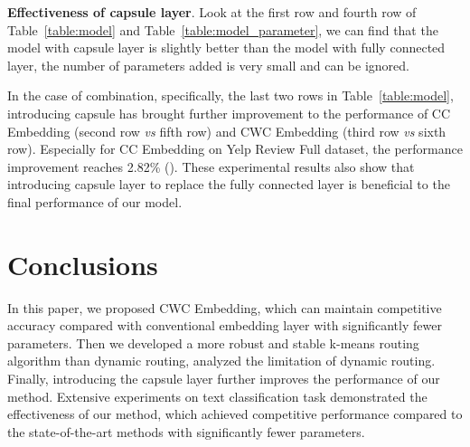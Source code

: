 \documentclass[times,twocolumn,final]{elsarticle}
\begin{document}
\noindent\textbf{Effectiveness of capsule layer}. Look at the first row and fourth row of Table~\ref{table:model} and Table~\ref{table:model_parameter}, we can find that the model with capsule layer is slightly better than the model with fully connected layer, the number of parameters added is very small and can be ignored.

In the case of combination, specifically, the last two rows in Table~\ref{table:model}, introducing capsule has brought further improvement to the performance of CC Embedding (second row \textit{vs} fifth row) and CWC Embedding (third row \textit{vs} sixth row). Especially for CC Embedding on Yelp Review Full dataset, the performance improvement reaches 2.82\% (). These experimental results also show that introducing capsule layer to replace the fully connected layer is beneficial to the final performance of our model.

\section{Conclusions}

In this paper, we proposed CWC Embedding, which can maintain competitive accuracy compared with conventional embedding layer with significantly fewer parameters. Then we developed a more robust and stable k-means routing algorithm than dynamic routing, analyzed the limitation of dynamic routing. Finally, introducing the capsule layer further improves the performance of our method. Extensive experiments on text classification task demonstrated the effectiveness of our method, which achieved competitive performance compared to the state-of-the-art methods with significantly fewer parameters.



\end{document}
